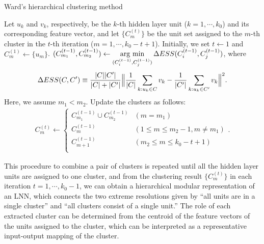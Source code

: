 \documentclass{article}
\newcommand{\argmin}{\mathop{\rm arg~min}\limits}
\begin{document}
\begin{algorithm}[t]
\caption{Ward's hierarchical clustering method\cite{Ward1963}}
\label{alg:wards}
\begin{algorithmic}[1]
\STATE Let $u_k$ and $v_k$, respectively, be the $k$-th hidden layer unit ($k=1, \cdots , k_0$) and its corresponding feature vector, and let $\{C^{(t)}_m\}$ be the unit set assigned to the $m$-th cluster in the $t$-th iteration ($m=1, \cdots , k_0 -t+1$). Initially, we set $t\gets 1$ and $C^{(1)}_m \gets \{u_m\}$. 
  \STATE $(C^{(t-1)}_{m_1}, C^{(t-1)}_{m_2})\gets \argmin_{(C^{(t-1)}_{i}, C^{(t-1)}_{j})} \Delta ESS(C^{(t-1)}_{i}, C^{(t-1)}_{j})$, where 
  \begin{eqnarray*}
  \Delta ESS(C, C') \equiv \frac{|C||C'|}{|C|+|C'|}\Bigl\|\frac{1}{|C|}\sum_{k: u_k\in C} v_k-\frac{1}{|C'|}\sum_{k: u_k\in C'} v_k\Bigr\|^2.
  \end{eqnarray*}
  Here, we assume $m_1<m_2$. 
  \STATE Update the clusters as follows:
  \begin{eqnarray*}
  C^{(t)}_{m}\gets \left\{ \begin{array}{ll}
  C^{(t-1)}_{m_1}\cup C^{(t-1)}_{m_2} & (m=m_1) \\
  C^{(t-1)}_{m} & (1\leq m\leq m_2-1, m\neq m_1) \\
  C^{(t-1)}_{m+1} & (m_2\leq m \leq k_0 -t+1) \\
  \end{array} \right. .
  \end{eqnarray*} 
\ENDFOR
\end{algorithmic}
\end{algorithm}

This procedure to combine a pair of clusters is repeated until all the hidden layer units are assigned to one cluster, and from the clustering result $\{C^{(t)}_m\}$ in each iteration $t=1, \cdots , k_0-1$, we can obtain a hierarchical modular representation of an LNN, which connects the two extreme resolutions given by ``all units are in a single cluster'' and ``all clusters consist of a single unit.'' The role of each extracted cluster can be determined from the centroid of the feature vectors of the units assigned to the cluster, which can be interpreted as a representative input-output mapping of the cluster. 

\end{document}
